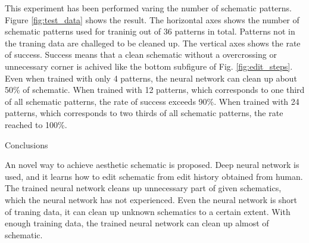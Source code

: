 \documentclass[twocolumn]{article}
\makeatletter
\def\section{\@startsection {section}{1}{\z@}{20pt plus 2pt minus 2pt}
{8pt plus 2pt minus 2pt}{\centering\normalsize\sc
\edef\@svsec{\thesection.\ }}}
\def\thesection{\Roman{section}}
\makeatother
\begin{document}
This experiment has been performed varing the number of schematic patterns.
Figure \ref{fig:test_data} shows the result.
The horizontal axes shows the number of schematic patterns used for traninig
out of 36 patterns in total.
Patterns not in the traning data are challeged to be cleaned up.
The vertical axes shows the rate of success.
Success means that a clean schematic
without a overcrossing or unnecessary corner is achived
like the bottom subfigure of Fig. \ref{fig:edit_steps}.
Even when trained with only 4 patterns,
the neural network can clean up about 50\% of schematic.
When trained with 12 patterns,
which corresponds to one third of all schematic patterns,
the rate of success exceeds 90\%.
When trained with 24 patterns,
which corresponds to two thirds of all schematic patterns,
the rate reached to 100\%.


\section{Conclusions}

An novel way to achieve aesthetic schematic is proposed.
Deep neural network is used, and it learns how to edit schematic
from edit history obtained from human.
The trained neural network cleans up unnecessary part of given schematics,
which the neural network has not experienced.
Even the neural network is short of traning data,
it can clean up unknown schematics to a certain extent.
With enough training data,
the trained neural network can clean up almost of schematic.

\end{document}
